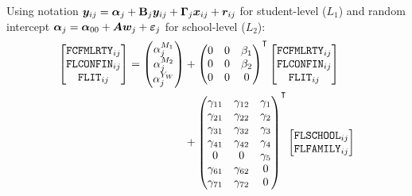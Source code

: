 \documentclass[a4paper,11pt,UKenglish,twoside,openright]{report}\usepackage[]{graphicx}\usepackage[]{color}
\begin{document}
Using  notation $\boldsymbol{y}_{ij} = \boldsymbol{\alpha}_j + \boldsymbol{\mathrm{B}}_j\boldsymbol{y}_{ij} + \boldsymbol{\Gamma}_j\boldsymbol{x}_{ij} + \boldsymbol{r}_{ij}$ for student-level ($L_1$) and random intercept $\boldsymbol{\alpha}_{j} = \boldsymbol{\alpha}_{00} + \boldsymbol{A}\boldsymbol{w}_j + \boldsymbol{\varepsilon}_j$ for school-level ($L_2$):
\begin{equation}
    \begin{aligned}
        \begin{bmatrix}
            \texttt{FCFMLRTY}_{ij}\\
            \texttt{FLCONFIN}_{ij}\\
            \texttt{FLIT}_{ij}
        \end{bmatrix} =
        \begin{pmatrix}
            \alpha^{M_1}_{j}\\
            \alpha^{M_2}_{j}\\
            \alpha^{Y_W}_{j}\\
        \end{pmatrix} &+
        \begin{pmatrix}
            0   &0  &\beta_1\\
            0   &0  &\beta_2\\
            0   &0  &0\\
        \end{pmatrix}\Ts
        \begin{bmatrix}
            \texttt{FCFMLRTY}_{ij}\\
            \texttt{FLCONFIN}_{ij}\\
            \texttt{FLIT}_{ij}
        \end{bmatrix}\\
        &+
        \begin{pmatrix}
            \gamma_{11}  &\gamma_{12}   &\gamma_1\\
            \gamma_{21}  &\gamma_{22}   &\gamma_2\\
            \gamma_{31}  &\gamma_{32}   &\gamma_3\\
            \gamma_{41}  &\gamma_{42}   &\gamma_4\\
            0  &0   &\gamma_5\\
            \gamma_{61}  &\gamma_{62}   &0\\
            \gamma_{71}  &\gamma_{72}   &0
        \end{pmatrix}\Ts
        \begin{bmatrix}
            \texttt{FLSCHOOL}_{ij}\\
            \texttt{FLFAMILY}_{ij}\\

\end{bmatrix}
\end{aligned}
\end{equation}
\end{document}
